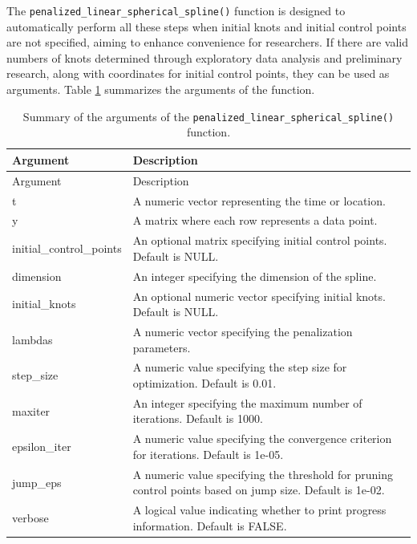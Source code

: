 The \texttt{penalized\_linear\_spherical\_spline()} function is designed to automatically perform all these steps when initial knots and initial control points are not specified, aiming to enhance convenience for researchers. If there are valid numbers of knots determined through exploratory data analysis and preliminary research, along with coordinates for initial control points, they can be used as arguments. Table \ref{tab:penalized-linear-spherical-spline} summarizes the arguments of the function.

\begin{longtable}[]{@{}
  >{\raggedright\arraybackslash}p{}
  >{\raggedright\arraybackslash}p{}@{}}
\caption{\label{tab:penalized-linear-spherical-spline} Summary of the arguments of the \texttt{penalized\_linear\_spherical\_spline()} function.}\tabularnewline
\toprule\noalign{}
\begin{minipage}[b]{\linewidth}\raggedright
Argument
\end{minipage} & \begin{minipage}[b]{\linewidth}\raggedright
Description
\end{minipage} \\
\midrule\noalign{}
\endfirsthead
\toprule\noalign{}
\begin{minipage}[b]{\linewidth}\raggedright
Argument
\end{minipage} & \begin{minipage}[b]{\linewidth}\raggedright
Description
\end{minipage} \\
\midrule\noalign{}
\endhead
\bottomrule\noalign{}
\endlastfoot
t & A numeric vector representing the time or location. \\
y & A matrix where each row represents a data point. \\
initial\_control\_points & An optional matrix specifying initial control points. Default is NULL. \\
dimension & An integer specifying the dimension of the spline. \\
initial\_knots & An optional numeric vector specifying initial knots. Default is NULL. \\
lambdas & A numeric vector specifying the penalization parameters. \\
step\_size & A numeric value specifying the step size for optimization. Default is 0.01. \\
maxiter & An integer specifying the maximum number of iterations. Default is 1000. \\
epsilon\_iter & A numeric value specifying the convergence criterion for iterations. Default is 1e-05. \\
jump\_eps & A numeric value specifying the threshold for pruning control points based on jump size. Default is 1e-02. \\
verbose & A logical value indicating whether to print progress information. Default is FALSE. \\
\end{longtable}

